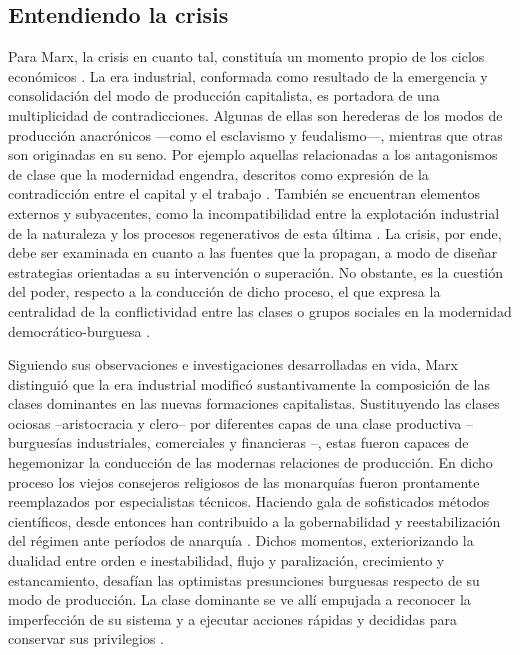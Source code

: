 \documentclass{textolivre}
\begin{document}
\subsection{Entendiendo la crisis}\label{sec-crisis}
Para Marx, la crisis en cuanto tal, constituía un momento propio de los ciclos
económicos \cite[p. 11--12]{marx2010}. La era industrial, conformada como resultado de la
emergencia y consolidación del modo de producción capitalista, es portadora de una
multiplicidad de contradicciones. Algunas de ellas son herederas de los modos de
producción anacrónicos —como el esclavismo y feudalismo—, mientras que otras son
originadas en su seno. Por ejemplo aquellas relacionadas a los antagonismos de clase
que la modernidad engendra, descritos como expresión de la contradicción entre el capital
y el trabajo \cite{wallerstein}. También se encuentran elementos
externos y subyacentes, como la incompatibilidad entre la explotación industrial de la
naturaleza y los procesos regenerativos de esta última \cite{Foster2016}. La crisis, por
ende, debe ser examinada en cuanto a las fuentes que la propagan, a modo de diseñar
estrategias orientadas a su intervención o superación. No obstante, es la cuestión del
poder, respecto a la conducción de dicho proceso, el que expresa la centralidad de la
conflictividad entre las clases o grupos sociales en la modernidad democrático-burguesa
\cite{lenin1997}.

Siguiendo sus observaciones e investigaciones desarrolladas en vida, Marx
distinguió que la era industrial modificó sustantivamente la composición de las clases
dominantes en las nuevas formaciones capitalistas. Sustituyendo las clases ociosas --aristocracia y clero-- por diferentes capas de una clase productiva --burguesías
industriales, comerciales y financieras \cite{marx2003}--, estas fueron capaces de
hegemonizar la conducción de las modernas relaciones de producción. En dicho proceso
los viejos consejeros religiosos de las monarquías fueron prontamente reemplazados por
especialistas técnicos. Haciendo gala de sofisticados métodos científicos, desde entonces
han contribuido a la gobernabilidad y reestabilización del régimen ante períodos de
anarquía \cite{Gunderson2019}. Dichos momentos, exteriorizando la
dualidad entre orden e inestabilidad, flujo y paralización, crecimiento y estancamiento,
desafían las optimistas presunciones burguesas respecto de su modo de producción. La
clase dominante se ve allí empujada a reconocer la imperfección de su sistema y a
ejecutar acciones rápidas y decididas para conservar sus privilegios \cite{lenin1997}.
\end{document}
